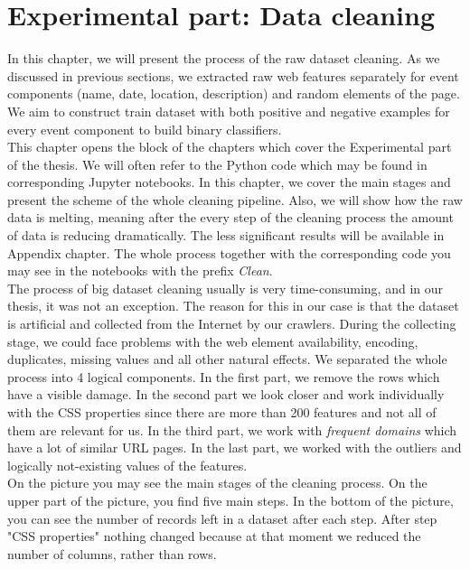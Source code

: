 \chapter{Experimental part: Data cleaning}
\label{chap:clean}
In this chapter, we will present the process of the raw dataset cleaning. As we discussed in previous sections, we extracted raw web features separately for event components (name, date, location, description) and random elements of the page. We aim to construct train dataset with both positive and negative examples for every event component to build binary classifiers. \\

This chapter opens the block of the chapters which cover the Experimental part of the thesis. We will often refer to the Python code which may be found in corresponding Jupyter notebooks. In this chapter, we cover the main stages and present the scheme of the whole cleaning pipeline. Also, we will show how the raw data is melting, meaning after the every step of the cleaning process the amount of data is reducing dramatically. The less significant results will be available in Appendix chapter. The whole process together with the corresponding code you may see in the notebooks with the prefix \textit{Clean}.\\

The process of big dataset cleaning usually is very time-consuming, and in our thesis, it was not an exception. The reason for this in our case is that the dataset is artificial and collected from the Internet by our crawlers. During the collecting stage, we could face problems with the web element availability, encoding, duplicates, missing values and all other natural effects. We separated the whole process into 4 logical components. In the first part, we remove the rows which have a visible damage. In the second part we look closer and work individually with the CSS properties since there are more than 200 features and not all of them are relevant for us. In the third part, we work with \textit{frequent domains} which have a lot of similar URL pages. In the last part, we worked with the outliers and logically not-existing values of the features. \\

On the picture  you may see the main stages of the cleaning process. On the upper part of the picture, you find five main steps. In the bottom of the picture, you can see the number of records left in a dataset after each step. After step "CSS properties" nothing changed because at that moment we reduced the number of columns, rather than rows. 

